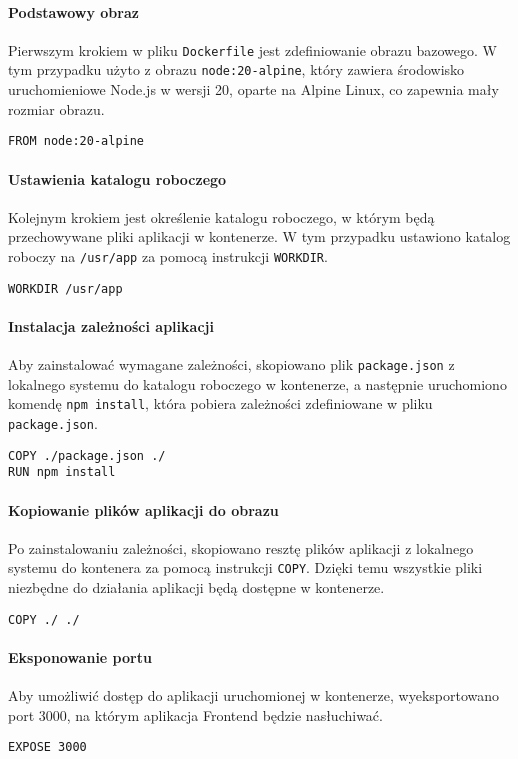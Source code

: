 \paragraph{Podstawowy obraz}
Pierwszym krokiem w pliku \texttt{Dockerfile} jest zdefiniowanie obrazu bazowego. W tym przypadku użyto z obrazu \texttt{node:20-alpine}, który zawiera środowisko uruchomieniowe Node.js w wersji 20, oparte na Alpine Linux, co zapewnia mały rozmiar obrazu.
\begin{lstlisting}
FROM node:20-alpine
\end{lstlisting}

\paragraph{Ustawienia katalogu roboczego}
Kolejnym krokiem jest określenie katalogu roboczego, w którym będą przechowywane pliki aplikacji w kontenerze. W tym przypadku ustawiono katalog roboczy na \texttt{/usr/app} za pomocą instrukcji \texttt{WORKDIR}.
\begin{lstlisting}
WORKDIR /usr/app
\end{lstlisting}

\paragraph{Instalacja zależności aplikacji}
Aby zainstalować wymagane zależności, skopiowano plik \texttt{package.json} z lokalnego systemu do katalogu roboczego w kontenerze, a następnie uruchomiono komendę \texttt{npm install}, która pobiera zależności zdefiniowane w pliku \texttt{package.json}.
\begin{lstlisting}
COPY ./package.json ./
RUN npm install
\end{lstlisting}

\paragraph{Kopiowanie plików aplikacji do obrazu}
Po zainstalowaniu zależności, skopiowano resztę plików aplikacji z lokalnego systemu do kontenera za pomocą instrukcji \texttt{COPY}. Dzięki temu wszystkie pliki niezbędne do działania aplikacji będą dostępne w kontenerze.
\begin{lstlisting}
COPY ./ ./
\end{lstlisting}

\paragraph{Eksponowanie portu}
Aby umożliwić dostęp do aplikacji uruchomionej w kontenerze, wyeksportowano port 3000, na którym aplikacja Frontend będzie nasłuchiwać.
\begin{lstlisting}
EXPOSE 3000
\end{lstlisting}

